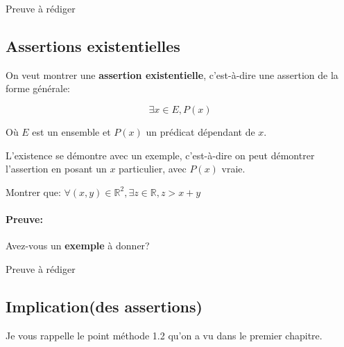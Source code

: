 \documentclass{article}
\begin{document}
\noindent Preuve à rédiger









\subsection{Assertions existentielles}

On veut montrer une \textbf{assertion existentielle}, c'est-à-dire une assertion de la forme générale:

\[
\exists x \in E, P(x)
\]

Où $E$ est un ensemble et $P(x)$ un prédicat dépendant de $x$.

\begin{tcolorbox}[colback=green!5!white,colframe=green!75!black,title=Point méthode 4.2]

L'existence se démontre avec un exemple, c'est-à-dire on peut démontrer l'assertion en posant un $x$ particulier, avec $P(x)$ vraie.

\end{tcolorbox}


\begin{tcolorbox}[colback=cyan!5!white,colframe=cyan!75!black,title=Exercice]

Montrer que: $\forall (x,y) \in \mathbb{R}^{2}, \exists z \in \mathbb{R}, z > x + y $

\end{tcolorbox}

\paragraph{Preuve:} Avez-vous un \textbf{exemple} à donner?

\noindent Preuve à rédiger











\subsection{Implication(des assertions)}

Je vous rappelle le point méthode 1.2 qu'on a vu dans le premier chapitre.
\end{document}
